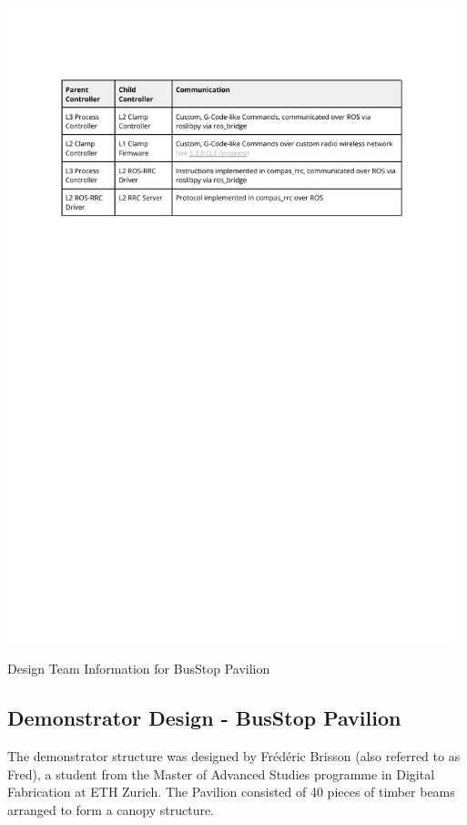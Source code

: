 \begin{table}[h]
    \includegraphics[page=12, trim=25.4mm 220mm 25.4mm 33mm, clip, width=0.98\textwidth]{tables/Tables in Chapter 5.pdf}
    \caption{Design Team Information for BusStop Pavilion}
    \label{table:design-team-members-round2}
\end{table}

\FloatBarrier

\subsection{Demonstrator Design - BusStop Pavilion}
\label{subsection:exploration-2-demonstrator-design-busstop-pavilion}

The demonstrator structure was designed by Frédéric Brisson (also referred to as Fred), a student from the Master of Advanced Studies programme in Digital Fabrication at ETH Zurich. The Pavilion consisted of 40 pieces of timber beams arranged to form a canopy structure. 

